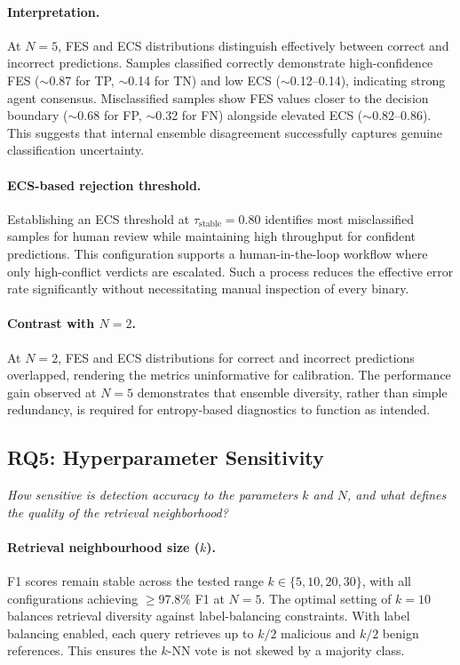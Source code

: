 \documentclass[pdflatex,sn-mathphys-num]{sn-jnl}
\begin{document}
\paragraph{Interpretation.}
At $N{=}5$, FES and ECS distributions distinguish effectively between correct and incorrect predictions. Samples classified correctly demonstrate high-confidence FES ($\sim$0.87 for TP, $\sim$0.14 for TN) and low ECS ($\sim$0.12--0.14), indicating strong agent consensus. Misclassified samples show FES values closer to the decision boundary ($\sim$0.68 for FP, $\sim$0.32 for FN) alongside elevated ECS ($\sim$0.82--0.86). This suggests that internal ensemble disagreement successfully captures genuine classification uncertainty.

\paragraph{ECS-based rejection threshold.}
Establishing an ECS threshold at $\tau_{\text{stable}} = 0.80$ identifies most misclassified samples for human review while maintaining high throughput for confident predictions. This configuration supports a human-in-the-loop workflow where only high-conflict verdicts are escalated. Such a process reduces the effective error rate significantly without necessitating manual inspection of every binary.

\paragraph{Contrast with $N{=}2$.}
At $N{=}2$, FES and ECS distributions for correct and incorrect predictions overlapped, rendering the metrics uninformative for calibration. The performance gain observed at $N{=}5$ demonstrates that ensemble diversity, rather than simple redundancy, is required for entropy-based diagnostics to function as intended.

\subsection{RQ5: Hyperparameter Sensitivity}
\label{sec:rq5}
\textit{How sensitive is detection accuracy to the parameters $k$ and $N$, and what defines the quality of the retrieval neighborhood?}

\paragraph{Retrieval neighbourhood size ($k$).}
F1 scores remain stable across the tested range $k \in \{5, 10, 20, 30\}$, with all configurations achieving $\geq$97.8\% F1 at $N{=}5$. The optimal setting of $k{=}10$ balances retrieval diversity against label-balancing constraints. With label balancing enabled, each query retrieves up to $k/2$ malicious and $k/2$ benign references. This ensures the $k$-NN vote is not skewed by a majority class.
\end{document}
